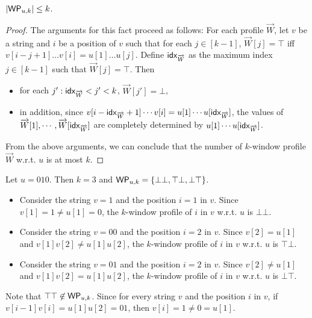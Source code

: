 
\begin{proposition}
$|\mathsf{WP}_{u,k}| \le k$.
\end{proposition}
\begin{proof}
The arguments for this fact proceed as follows: For each profile $\overrightarrow{W}$, let $v$ be a string and $i$ be a position of $v$ such that for each $j \in [k-1]$, $\overrightarrow{W}[j] = \top$ iff $v[i-j+1] \dots v[i] = u[1] \dots u[j]$. Define ${\sf idx}_{\overrightarrow{W}}$ as the maximum index $j \in [k-1]$ such that $\overrightarrow{W}[j]=\top$. Then 
\begin{itemize}
	\item for each $j': {\sf idx}_{\overrightarrow{W}} < j' < k$, $\overrightarrow{W}[j']=\bot$, 
	\item in addition, since $v[i-{\sf idx}_{\overrightarrow{W}}+1] \cdots v[i] = u[1] \cdots u[{\sf idx}_{\overrightarrow{W}}]$, the values of $\overrightarrow{W}[1],\cdots, \overrightarrow{W}[{\sf idx}_{\overrightarrow{W}}]$ are completely determined by $u[1] \cdots u[{\sf idx}_{\overrightarrow{W}}]$.
\end{itemize}
From the above arguments, we can  conclude that the number of $k$-window profile $\vec{W}$ w.r.t. $u$ is at most $k$.
\end{proof}

\begin{example}\label{wprof-exmp}
Let $u = 010$. Then $k=3$ and $\mathsf{WP}_{u,k}=\{\bot\bot, \top\bot, \bot\top\}$. 
\begin{itemize}
\item Consider the string $v=1$ and the position $i=1$ in $v$. Since $v[1]=1 \neq u[1]=0$, the $k$-window profile of $i$ in $v$ w.r.t. $u$ is $\bot \bot$. 
\item Consider the string $v=00$ and the position $i=2$ in $v$. Since $v[2]=u[1]$ and $v[1]v[2] \neq u[1]u[2]$, the $k$-window profile of $i$ in $v$ w.r.t. $u$ is $\top\bot$.
\item Consider the string $v=01$ and the position $i=2$ in $v$. Since $v[2] \neq u[1]$ and $v[1]v[2] = u[1]u[2]$, the $k$-window profile of $i$ in $v$ w.r.t. $u$ is $\bot\top$.
\end{itemize}
Note that $\top\top \not \in \mathsf{WP}_{u,k}$. Since for every string $v$ and the position $i$ in $v$, if $v[i-1]v[i]=u[1]u[2]=01$, then $v[i]=1 \neq 0= u[1]$. 
\end{example}

